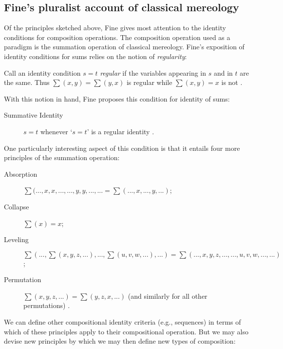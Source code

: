 \documentclass[12pt,twoside]{reedfancy}
\newenvironment{squote}{%
	\begin{spacing}{1}
	\begin{list}{}{%
	\setlength{\labelwidth}{0pt}%
	\rightmargin\leftmargin%
	}
	\item\relax
	}{%
	\end{list}%
	\end{spacing}
	}
\begin{document}
\begin{spacing}{1.25}
\subsection{Fine's pluralist account of classical mereology}
\label{classical}
Of the principles sketched above, Fine gives most attention to the
identity conditions for composition operations.  The composition
operation used as a paradigm is the summation operation of classical
mereology.  Fine's exposition of identity conditions for sums relies
on the notion of {\em regularity}:

\begin{squote}
Call an identity condition $s = t$ {\em regular} if the variables
appearing in $s$ and in $t$ are the same.  Thus $\sum (x, y) = \sum
(y, x)$ is regular while $\sum (x, y) = x$ is not
\citeyearpar[572]{fine2010}.
\end{squote}

With this notion in hand, Fine proposes this condition for identity of
sums:

\begin{description}
  \item[Summative Identity] $s = t$ whenever `$s = t$' is a regular
    identity \citeyearpar[572]{fine2010}.
\end{description}

One particularly interesting aspect of this condition is that it
entails four more principles of the summation operation:

\begin{description}
  \item[Absorption] $\sum (..., x, x, ...,
    ..., y, y, ..., ... = \sum (
    ..., x, ..., y, ... )$;
\item[Collapse] $\sum (x) = x$;
\item[Leveling] $\sum (..., \sum (x, y, z, ... ), ..., \sum (u, v, w, ... ), ... ) = \sum (..., x, y, z, ..., ..., u, v, w, ..., ... )$;
\item[Permutation] $\sum (x, y, z, ... ) = \sum (y, z, x,
  ... )$ (and similarly for all other permutations)
  \citep[573]{fine2010}.
\end{description}

We can define other compositional identity criteria (e.g., sequences)
in terms of which of these principles apply to their compositional
operation.  But we may also devise new principles by which we may then
define new types of composition:


\end{spacing}
\end{document}
